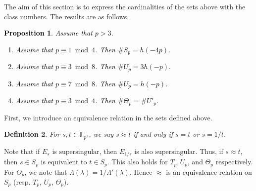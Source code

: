 \documentclass[a4paper, 11pt]{article}
\newtheorem{defn}{Definition}[section]
\theoremstyle{plain}
\newtheorem{prop}[defn]{Proposition}
\newcommand{\?}{\textcolor{red}{??}}
\newcommand{\lm}{\lambda}
\newcommand{\Lm}{\Lambda}
\newcommand{\fpp}{\mathbb{F}_{p^2}}
\newcommand{\super}{\text{supersingular}}
\begin{document}
The aim of this section is to express the cardinalities of the sets above with the class numbers. The results are as follows. 
\textcolor{black}{
\begin{prop}
    \label{classnumber}
    Assume that $p>3$.
    \begin{enumerate}
        \item [\rm{(a)}] Assume that $ p \equiv 1 \bmod 4$. Then   $\#S_p=h(-4p)$. 
        \item [\rm{(b)}] Assume that $p \equiv 3  \bmod 8 $. Then $\#U_p=3h(-p).$ 
        \item[\rm{(c)}] Assume that $ p \equiv 7 \bmod 8$. Then $\#U_p=h(-p)$.
        \item[\rm{(d)}] Assume that $p \equiv 3 \bmod 4$. Then $\#{\Theta}_p=\# U'_p$.
    \end{enumerate}
\end{prop}
}

   

   

 

First, we introduce an equivalence relation in the sets defined above.
\begin{defn}
\label{eqrelation}
For $s,t \in \fpp$, we say $s \approx t$ if and only if $s=t$ or $s=1/t$.
\end{defn}
 Note that if $E_s$ is $\super$, then $E_{1/s}$ is also $\super$. Thus, if $s \approx t $, then $s \in S_p$ is equivalent to $t \in S_p$. This also holds for $T_p, U_p$, and ${\Theta}_p$ respectively. For ${\Theta}_p$, we note that $\Lm(\lm)=1/{\Lm}'(\lm)$. Hence $\approx$ is an \textcolor{black}{equivalence} relation on $S_p$ (resp. $T_p$,  $U_p$, ${\Theta}_p$).
    
\end{document}
